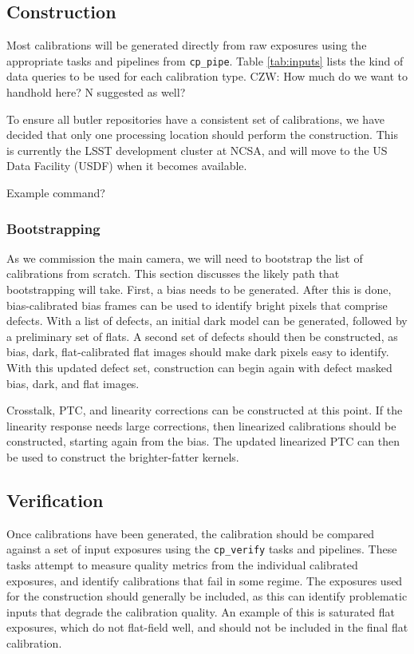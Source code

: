 \documentclass[DM,authoryear,toc]{lsstdoc}
\begin{document}
\subsection{Construction}

Most calibrations will be generated directly from raw exposures using the appropriate tasks and pipelines from \verb|cp_pipe|.  Table \ref{tab:inputs} lists the kind of data queries to be used for each calibration type.  CZW: How much do we want to handhold here?  N suggested as well?

To ensure all butler repositories have a consistent set of calibrations, we have decided that only one processing location should perform the construction.  This is currently the LSST development cluster at NCSA, and will move to the US Data Facility (USDF) when it becomes available.

Example command?

\subsubsection{Bootstrapping}

As we commission the main camera, we will need to bootstrap the list of calibrations from scratch.  This section discusses the likely path that bootstrapping will take.  First, a bias needs to be generated.  After this is done, bias-calibrated bias frames can be used to identify bright pixels that comprise defects.  With a list of defects, an initial dark model can be generated, followed by a preliminary set of flats.  A second set of defects should then be constructed, as bias, dark, flat-calibrated flat images should make dark pixels easy to identify.  With this updated defect set, construction can begin again with defect masked bias, dark, and flat images.

Crosstalk, PTC, and linearity corrections can be constructed at this point.  If the linearity response needs large corrections, then linearized calibrations should be constructed, starting again from the bias.  The updated linearized PTC can then be used to construct the brighter-fatter kernels.

\subsection{Verification}

Once calibrations have been generated, the calibration should be compared against a set of input exposures using the \verb|cp_verify| tasks and pipelines.  These tasks attempt to measure quality metrics from the individual calibrated exposures, and identify calibrations that fail in some regime.  The exposures used for the construction should generally be included, as this can identify problematic inputs that degrade the calibration quality.  An example of this is saturated flat exposures, which do not flat-field well, and should not be included in the final flat calibration.
\end{document}

